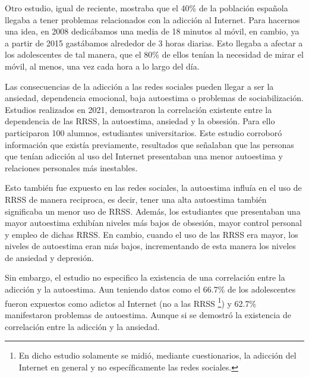 \vspace{0.3cm}

Otro estudio, igual de reciente, mostraba que el 40\% de la población española llegaba a tener problemas relacionados con la adicción al Internet. Para hacernos una idea, en 2008 dedicábamos una media de 18 minutos al móvil, en cambio, ya a partir de 2015 gastábamos alrededor de 3 horas diarias. Esto llegaba a afectar a los adolescentes de tal manera, que el 80\% de ellos tenían la necesidad de mirar el móvil, al menos, una vez cada hora a lo largo del día. \cite{Adiccion-RRSS-Interesante}

\vspace{0.3cm}

Las consecuencias de la adicción a las redes sociales pueden llegar a ser la ansiedad, dependencia emocional, baja autoestima o problemas de sociabilización. Estudios realizados en 2021, demostraron la correlación existente entre la dependencia de las \acs{RRSS}, la autoestima, ansiedad y la obsesión. Para ello participaron 100 alumnos, estudiantes universitarios. Este estudio corroboró información que existía previamente, resultados que señalaban que las personas que tenían adicción al uso del Internet presentaban una menor autoestima y relaciones personales más inestables. \cite{CNEIP-RRSS-AS}

\vspace{0.3cm}

Esto también fue expuesto en las redes sociales, la autoestima influía en el uso de \acs{RRSS} de manera reciproca, es decir, tener una alta autoestima también significaba un menor uso de \acs{RRSS}. Además, los estudiantes que presentaban una mayor autoestima exhibían niveles más bajos de obsesión, mayor control personal y empleo de dichas \acs{RRSS}. En cambio, cuando el uso de las \acs{RRSS} era mayor, los niveles de autoestima eran más bajos, incrementando de esta manera los niveles de ansiedad y depresión.

\vspace{0.3cm}

Sin embargo, el estudio no especifico la existencia de una correlación entre la adicción y la autoestima. Aun teniendo datos como el 66.7\% de los adolescentes fueron expuestos como adictos al Internet (no a las \acs{RRSS} \footnote{En dicho estudio solamente se midió, mediante cuestionarios, la adicción del Internet en general y no específicamente las redes sociales.}) y 62.7\% manifestaron problemas de autoestima. Aunque si se demostró la existencia de correlación entre la adicción y la ansiedad. \cite{CNEIP-RRSS-AS}

